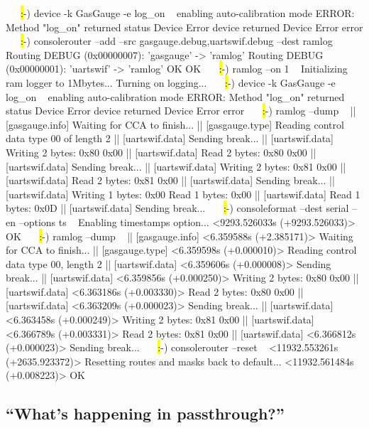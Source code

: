 \begin{AnnotedLogFile}
~~~\hl:-) device -k GasGauge -e log\_on ~
enabling auto-calibration mode
ERROR: Method "log_on" returned status Device Error
device returned Device Error error
~~~\hl:-) consolerouter --add --src gasgauge.debug,uartswif.debug --dest ramlog ~
Routing DEBUG (0x00000007): 'gasgauge' -> 'ramlog'
Routing DEBUG (0x00000001): 'uartswif' -> 'ramlog'
OK
OK
~~~\hl:-) ramlog --on 1 ~
Initializing ram logger to 1Mbytes...
Turning on logging...
~~~\hl:-) device -k GasGauge -e log\_on ~
enabling auto-calibration mode
ERROR: Method "log_on" returned status Device Error
device returned Device Error error 
~~~\hl:-) ramlog --dump ~
|| [gasgauge.info] Waiting for CCA to finish...
|| [gasgauge.type] Reading control data type 00 of length 2
|| [uartswif.data] Sending break...
|| [uartswif.data] Writing 2 bytes: 0x80 0x00
|| [uartswif.data] Read 2 bytes: 0x80 0x00 
|| [uartswif.data] Sending break...
|| [uartswif.data] Writing 2 bytes: 0x81 0x00
|| [uartswif.data] Read 2 bytes: 0x81 0x00 
|| [uartswif.data] Sending break...
|| [uartswif.data] Writing 1 bytes: 0x00 Read 1 bytes: 0x00 
|| [uartswif.data] Read 1 bytes: 0x0D 
|| [uartswif.data] Sending break...
~~~\hl:-) consoleformat --dest serial --en --options ts ~
Enabling timestamps option...
<9293.526033s (+9293.526033)> OK
~~~\hl:-) ramlog --dump ~
|| [gasgauge.info] <6.359588s (+2.385171)> Waiting for CCA to finish...
|| [gasgauge.type] <6.359598s (+0.000010)> Reading control data type 00, length 2
|| [uartswif.data] <6.359606s (+0.000008)> Sending break...
|| [uartswif.data] <6.359856s (+0.000250)> Writing 2 bytes: 0x80 0x00
|| [uartswif.data] <6.363186s (+0.003330)> Read 2 bytes: 0x80 0x00 
|| [uartswif.data] <6.363209s (+0.000023)> Sending break...
|| [uartswif.data] <6.363458s (+0.000249)> Writing 2 bytes: 0x81 0x00
|| [uartswif.data] <6.366789s (+0.003331)> Read 2 bytes: 0x81 0x00 
|| [uartswif.data] <6.366812s (+0.000023)> Sending break...
~~~\hl:-) consolerouter --reset  ~
<11932.553261s (+2635.923372)> Resetting routes and masks back to default...
<11932.561484s (+0.008223)> OK
\end{AnnotedLogFile}


\subsection{``What's happening in passthrough?''}

